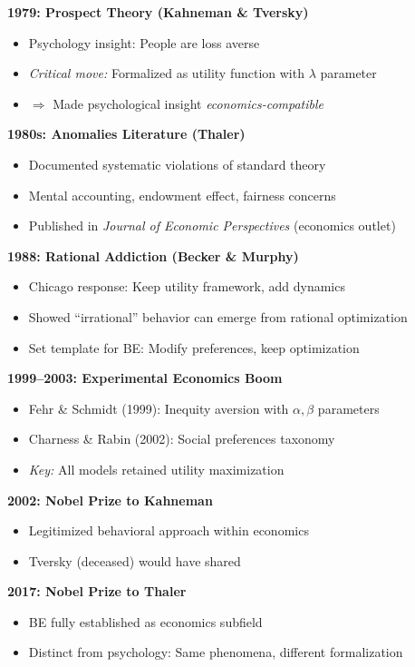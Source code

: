 \documentclass[11pt, a4paper]{article}
\begin{document}
\begin{tcolorbox}[colback=gray!5!white, colframe=gray!75!black,
    title=Historical Timeline: From Anomalies to Discipline]

\textbf{1979: Prospect Theory (Kahneman \& Tversky)}
\begin{itemize}[nosep]
\item Psychology insight: People are loss averse
\item \textit{Critical move:} Formalized as utility function with $\lambda$ parameter
\item $\Rightarrow$ Made psychological insight \textit{economics-compatible}
\end{itemize}

\textbf{1980s: Anomalies Literature (Thaler)}
\begin{itemize}[nosep]
\item Documented systematic violations of standard theory
\item Mental accounting, endowment effect, fairness concerns
\item Published in \textit{Journal of Economic Perspectives} (economics outlet)
\end{itemize}

\textbf{1988: Rational Addiction (Becker \& Murphy)}
\begin{itemize}[nosep]
\item Chicago response: Keep utility framework, add dynamics
\item Showed ``irrational'' behavior can emerge from rational optimization
\item Set template for BE: Modify preferences, keep optimization
\end{itemize}

\textbf{1999--2003: Experimental Economics Boom}
\begin{itemize}[nosep]
\item Fehr \& Schmidt (1999): Inequity aversion with $\alpha, \beta$ parameters
\item Charness \& Rabin (2002): Social preferences taxonomy
\item \textit{Key:} All models retained utility maximization
\end{itemize}

\textbf{2002: Nobel Prize to Kahneman}
\begin{itemize}[nosep]
\item Legitimized behavioral approach within economics
\item Tversky (deceased) would have shared
\end{itemize}

\textbf{2017: Nobel Prize to Thaler}
\begin{itemize}[nosep]
\item BE fully established as economics subfield
\item Distinct from psychology: Same phenomena, different formalization
\end{itemize}

\end{tcolorbox}
\end{document}
